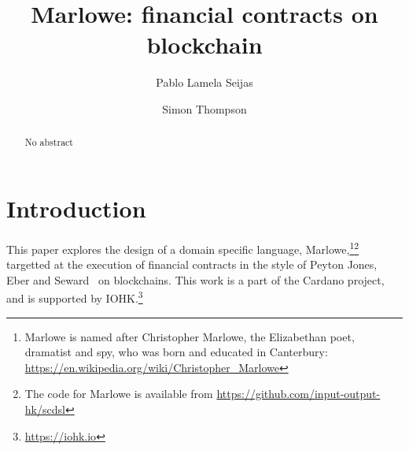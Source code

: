 \documentclass[
      acmsmall
    , screen
    , review=true
  ]{acmart}
\begin{document}
\title
  [Marlowe]
  {Marlowe: financial contracts on blockchain}

\author{Pablo Lamela Seijas}

\author{Simon Thompson}

\begin{abstract}
  No abstract
\end{abstract}



%
%


\maketitle


\section{Introduction}


\noindent
{}

This paper explores the design of a domain specific language, Marlowe,\footnote{Marlowe is named after Christopher Marlowe, the Elizabethan poet, dramatist and spy, who was born and educated in Canterbury: \url{https://en.wikipedia.org/wiki/Christopher_Marlowe}}\footnote{The code for Marlowe is available from \url{https://github.com/input-output-hk/scdsl}
} targetted at the execution of financial contracts in the style of Peyton Jones, Eber and Seward~\cite{PeytonJones:2000} on blockchains. This work is a part of the Cardano project, and is supported by IOHK.\footnote{\url{https://iohk.io}} 
\end{document}
